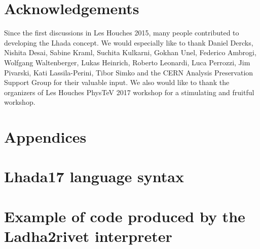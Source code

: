 \documentclass[11pt]{cernrep}
\begin{document}
\section*{Acknowledgements}

Since the first discussions in Les Houches 2015, many people contributed to developing the {\sc Lhada} concept.  
We would especially like to thank Daniel Dercks, Nishita Desai, Sabine Kraml, Suchita Kulkarni, Gokhan Unel, Federico Ambrogi, Wolfgang Waltenberger, Lukas Heinrich, Roberto Leonardi, Luca Perrozzi, Jim Pivarski, Kati Lassila-Perini, Tibor Simko and the CERN Analysis Preservation Support Group for their valuable input.  We also would like to thank the organizers of Les Houches PhysTeV 2017 workshop for a stimulating and fruitful workshop.



\section*{Appendices}

\appendix

\section{{\sc Lhada17} language syntax}\label{app:ebnf}


\section{Example of code produced by the {\sc Ladha2rivet} interpreter}\label{app:code}

\end{document}
